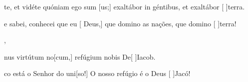 {  {\item {}te, et vidéte quóniam ego sum [us;] exaltábor in géntibus, et exaltábor [ ]{ter}ra.~\Antiphona}%
    {\item {} e sabei, conhecei que eu [ Deus,] que domino as nações, que domino [ ]{ter}ra!~\Antiphona},
  {\item {}nus virtútum no[cum,] refúgium nobis De\-[ ]{Ia}cob.~\Antiphona}%
    {\item {}co está o Senhor do uni[so!] O nosso refúgio é o Deus [ ]{Ja}có!~\Antiphona}
}